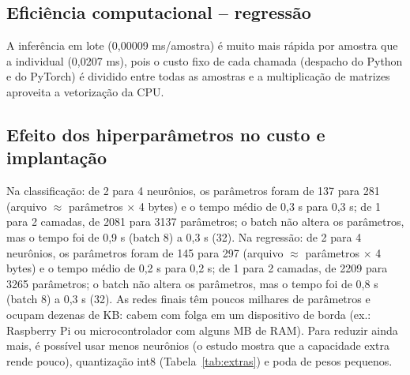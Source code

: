 \documentclass[11pt,a4paper]{article}
\begin{document}
\subsection{Eficiência computacional -- regressão}
\begin{table}[H]\centering\scriptsize{}
\caption{Eficiência (regressão). Energia estimada como potência assumida (15 W) $\times$ tempo; CO$_2$ = kWh $\times$ 45,8 g/kWh (fator do Brasil, Aula 08).}\label{tab:ef_reg}\end{table}
A inferência em lote (0,00009 ms/amostra) é muito mais rápida por amostra que a individual (0,0207 ms), pois o custo fixo de cada chamada (despacho do Python e do PyTorch) é dividido entre todas as amostras e a multiplicação de matrizes aproveita a vetorização da CPU.


\subsection{Efeito dos hiperparâmetros no custo e implantação}
Na classificação: de 2 para 4 neurônios, os parâmetros foram de 137 para 281 (arquivo $\approx$ parâmetros $\times$ 4 bytes) e o tempo médio de 0,3 s para 0,3 s; de 1 para 2 camadas, de 2081 para 3137 parâmetros; o batch não altera os parâmetros, mas o tempo foi de 0,9 s (batch 8) a 0,3 s (32). Na regressão: de 2 para 4 neurônios, os parâmetros foram de 145 para 297 (arquivo $\approx$ parâmetros $\times$ 4 bytes) e o tempo médio de 0,2 s para 0,2 s; de 1 para 2 camadas, de 2209 para 3265 parâmetros; o batch não altera os parâmetros, mas o tempo foi de 0,8 s (batch 8) a 0,3 s (32). 
As redes finais têm poucos milhares de parâmetros e ocupam dezenas de KB: cabem com folga em um dispositivo de borda (ex.: Raspberry Pi
ou microcontrolador com alguns MB de RAM). Para reduzir ainda mais, é possível usar menos neurônios (o estudo mostra que a capacidade
extra rende pouco), quantização int8 (Tabela~\ref{tab:extras}) e poda de pesos pequenos. %
\end{document}
